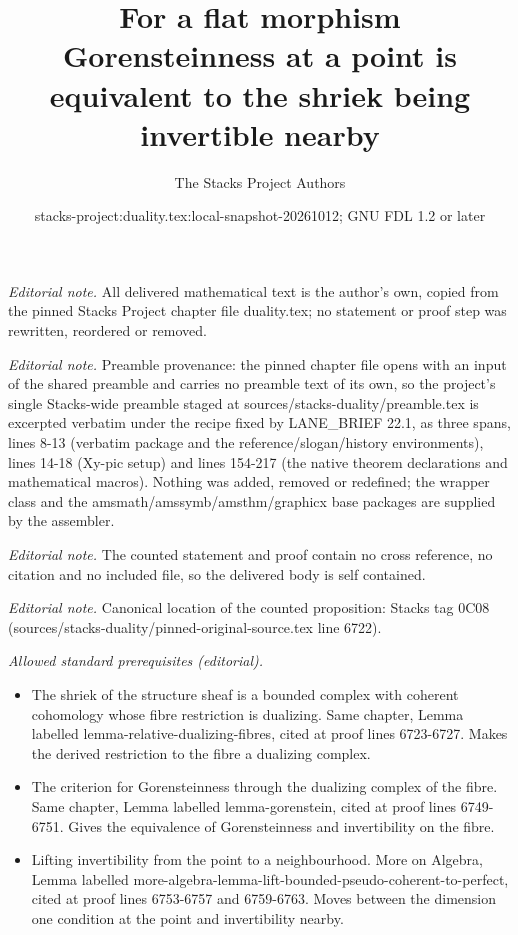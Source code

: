 \documentclass[10pt,a4paper]{amsart}
\title{For a flat morphism Gorensteinness at a point is equivalent to the shriek being invertible nearby}
\author{The Stacks Project Authors}
\date{stacks-project:duality.tex:local-snapshot-20261012; GNU FDL 1.2 or later}
\theoremstyle{plain}
\theoremstyle{definition}
\theoremstyle{remark}
\numberwithin{equation}{subsection}
\begin{document}
\maketitle
\noindent\textit{Editorial note.} All delivered mathematical text is the author's own, copied from the pinned Stacks Project chapter file duality.tex; no statement or proof step was rewritten, reordered or removed.\par\medskip
\noindent\textit{Editorial note.} Preamble provenance: the pinned chapter file opens with an input of the shared preamble and carries no preamble text of its own, so the project's single Stacks-wide preamble staged at sources/stacks-duality/preamble.tex is excerpted verbatim under the recipe fixed by LANE\_BRIEF 22.1, as three spans, lines 8-13 (verbatim package and the reference/slogan/history environments), lines 14-18 (Xy-pic setup) and lines 154-217 (the native theorem declarations and mathematical macros). Nothing was added, removed or redefined; the wrapper class and the amsmath/amssymb/amsthm/graphicx base packages are supplied by the assembler.\par\medskip
\noindent\textit{Editorial note.} The counted statement and proof contain no cross reference, no citation and no included file, so the delivered body is self contained.\par\medskip
\noindent\textit{Editorial note.} Canonical location of the counted proposition: Stacks tag 0C08 (sources/stacks-duality/pinned-original-source.tex line 6722).\par\medskip
\noindent\textit{Allowed standard prerequisites (editorial).}\begin{itemize}
\item The shriek of the structure sheaf is a bounded complex with coherent cohomology whose fibre restriction is dualizing. Same chapter, Lemma labelled lemma-relative-dualizing-fibres, cited at proof lines 6723-6727. Makes the derived restriction to the fibre a dualizing complex.
\item The criterion for Gorensteinness through the dualizing complex of the fibre. Same chapter, Lemma labelled lemma-gorenstein, cited at proof lines 6749-6751. Gives the equivalence of Gorensteinness and invertibility on the fibre.
\item Lifting invertibility from the point to a neighbourhood. More on Algebra, Lemma labelled more-algebra-lemma-lift-bounded-pseudo-coherent-to-perfect, cited at proof lines 6753-6757 and 6759-6763. Moves between the dimension one condition at the point and invertibility nearby.
\end{itemize}\medskip
\end{document}
